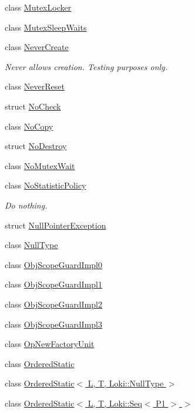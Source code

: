 \begin{DoxyCompactItemize}
class \hyperlink{classLoki_1_1MutexLocker}{Mutex\+Locker}
\item 
class \hyperlink{classLoki_1_1MutexSleepWaits}{Mutex\+Sleep\+Waits}
\item 
class \hyperlink{classLoki_1_1NeverCreate}{Never\+Create}
\begin{DoxyCompactList}\small\item\em Never allows creation. Testing purposes only. \end{DoxyCompactList}\item 
class \hyperlink{structLoki_1_1NeverReset}{Never\+Reset}
\item 
struct \hyperlink{structLoki_1_1NoCheck}{No\+Check}
\item 
class \hyperlink{classLoki_1_1NoCopy}{No\+Copy}
\item 
struct \hyperlink{structLoki_1_1NoDestroy}{No\+Destroy}
\item 
class \hyperlink{classLoki_1_1NoMutexWait}{No\+Mutex\+Wait}
\item 
class \hyperlink{classLoki_1_1NoStatisticPolicy}{No\+Statistic\+Policy}
\begin{DoxyCompactList}\small\item\em Do nothing. \end{DoxyCompactList}\item 
struct \hyperlink{structLoki_1_1NullPointerException}{Null\+Pointer\+Exception}
\item 
class \hyperlink{classLoki_1_1NullType}{Null\+Type}
\item 
class \hyperlink{classLoki_1_1ObjScopeGuardImpl0}{Obj\+Scope\+Guard\+Impl0}
\item 
class \hyperlink{classLoki_1_1ObjScopeGuardImpl1}{Obj\+Scope\+Guard\+Impl1}
\item 
class \hyperlink{classLoki_1_1ObjScopeGuardImpl2}{Obj\+Scope\+Guard\+Impl2}
\item 
class \hyperlink{classLoki_1_1ObjScopeGuardImpl3}{Obj\+Scope\+Guard\+Impl3}
\item 
class \hyperlink{classLoki_1_1OpNewFactoryUnit}{Op\+New\+Factory\+Unit}
\item 
class \hyperlink{classLoki_1_1OrderedStatic}{Ordered\+Static}
\item 
class \hyperlink{classLoki_1_1OrderedStatic_3_01L_00_01T_00_01Loki_1_1NullType_01_4}{Ordered\+Static$<$ L, T, Loki\+::\+Null\+Type $>$}
\item 
class \hyperlink{classLoki_1_1OrderedStatic_3_01L_00_01T_00_01Loki_1_1Seq_3_01P1_01_4_01_4}{Ordered\+Static$<$ L, T, Loki\+::\+Seq$<$ P1 $>$ $>$}

\end{DoxyCompactItemize}
